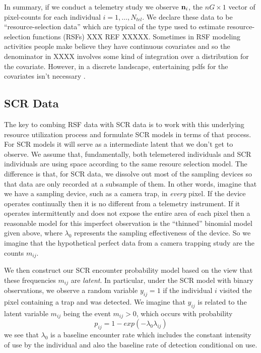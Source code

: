 
In summary, if we conduct a telemetry study we observe ${\bf n}_{i}$,
the $nG \times 1$ vector of pixel-counts for each individual
$i=1,\ldots,N_{tel}$.  We declare these data to be
``resource-selection data'' which are typical of the type used to
estimate resource-selection functions (RSFs) XXX REF XXXXX. Sometimes
in RSF modeling activities people make believe they have continuous
covariates and so the denominator in XXXX involves some kind of
integration over a distribution for the covariate. However, in a
discrete landscape, entertaining pdfs for the covariates isn't
necessary \citep{royle_etal:2012mee}.


\subsection{SCR Data}

The key to combing RSF data with SCR data is to work with this
underlying resource utilization process and formulate SCR models in
terms of that process. For SCR models it will serve as a intermediate
latent that we don't get to observe. We assume that, fundamentally,
both telemetered individuals and SCR individuals are using space
according to the same resourc selection model. The difference is that,
for SCR data, we dissolve out most of the sampling devices so that
data are only recorded at a subsample of them.
In other words, imagine that we have a sampling device, such as a
camera trap, in {\it every} pixel. If the device operates continually
then it is no different from a telemetry instrument. If it 
operates  intermittently and does not expose the entire area of
each pixel then a reasonable model for this imperfect observation is
the ``thinned'' binomial model given above, where $\lambda_{0}$
represents the sampling effectiveness of the device. So we imagine
that the hypothetical perfect data from a camera trapping study are
the counts $m_{ij}$. 

We then construct our SCR encounter probability model based on the
view that these frequencies $m_{ij}$ are {\it latent}. In particular,
under the SCR model with binary observations, 
 we observe a random variable 
$y_{ij} = 1$  if the individual $i$ visited the pixel
containing a trap and was detected. 
We imagine that $y_{ij}$ is related to the latent variable $m_{ij}$ being the
event $m_{ij}>0$, which occurs with probability 
\[
 p_{ij} = 1-exp(- \lambda_{0} \lambda_{ij})
\]
we see that $\lambda_{0}$ is a baseline encounter rate which includes
the constant intensity of use by the individual and also the baseline
rate of detection conditional on use. 



